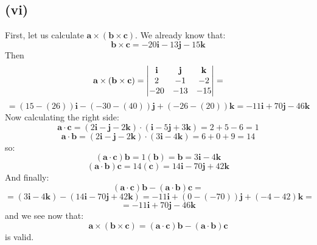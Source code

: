 \documentclass{article}
\begin{document}
\subsection*{(vi)}
First, let us calculate \(\textbf{a} \times (\textbf{b} \times \textbf{c})\). We already know that:
\begin{equation*}
    \textbf{b} \times \textbf{c} = -20\textbf{i} -13\textbf{j}  -15\textbf{k}
\end{equation*}
Then
\begin{equation*}
    \textbf{a} \times (\textbf{b} \times \textbf{c}) = \mdet{\textbf{i} & \textbf{j} & \textbf{k}\\ 2 & -1 & -2 \\ -20 & -13 & -15} =
\end{equation*}
\begin{equation*}
    = (15 - (26))\textbf{i} - (-30 - (40))\textbf{j} + (-26 - (20))\textbf{k} = -11 \textbf{i} + 70 \textbf{j} - 46\textbf{k}
\end{equation*}
Now calculating the right side:
\begin{equation*}
    \textbf{a} \cdot \textbf{c} = (2\textbf{i} -\textbf{j} - 2\textbf{k}) \cdot (\textbf{i} -5\textbf{j} + 3\textbf{k}) = 2 + 5 - 6 = 1
\end{equation*}
\begin{equation*}
    \textbf{a} \cdot \textbf{b} = (2\textbf{i} -\textbf{j} - 2\textbf{k}) \cdot (3\textbf{i} - 4\textbf{k}) = 6 + 0 + 9 = 14
\end{equation*}
so:
\begin{equation*}
    (\textbf{a} \cdot \textbf{c})\textbf{b} = 1(\textbf{b}) = \textbf{b} = 3\textbf{i} - 4\textbf{k}
\end{equation*}
\begin{equation*}
    (\textbf{a} \cdot \textbf{b})\textbf{c} = 14(\textbf{c}) = 14\textbf{i} - 70\textbf{j} + 42\textbf{k}
\end{equation*}
And finally:
\begin{equation*}
    (\textbf{a} \cdot \textbf{c})\textbf{b} - (\textbf{a} \cdot \textbf{b})\textbf{c} = 
\end{equation*}
\begin{equation*}
    = (3\textbf{i} -4\textbf{k}) - (14 \textbf{i} - 70\textbf{j} + 42\textbf{k}) = -11 \textbf{i} + (0 - (-70))\textbf{j} + (-4 -42)\textbf{k} =
\end{equation*}
\begin{equation*}
    = -11 \textbf{i} + 70 \textbf{j} - 46\textbf{k}
\end{equation*}
and we see now that:
\begin{equation*}
    \textbf{a} \times (\textbf{b} \times \textbf{c}) = (\textbf{a} \cdot \textbf{c})\textbf{b} - (\textbf{a} \cdot \textbf{b})\textbf{c}
\end{equation*}
is valid.
\end{document}
